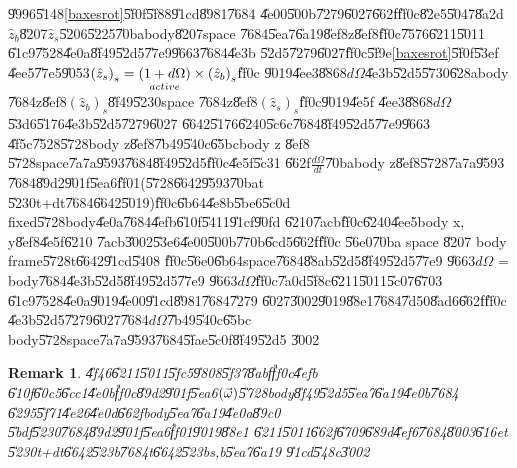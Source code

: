 \documentclass[12pt]{article}
\newtheorem{remark}[theorem]{Remark}
\begin{document}
\U{9996}\U{5148}\ref{baxesrot}\U{5f0f}\U{5f88}\U{91cd}\U{8981}\U{7684}%
\U{4e00}\U{500b}\U{7279}\U{6027}\U{662f}\U{ff0c}\U{82e5}\U{5047}\U{8a2d}$%
\hat{z}_{b}$\U{8207}$\hat{z}_{s}$\U{5206}\U{5225}\U{70ba}body\U{8207}space%
\U{7684}\U{5ea7}\U{6a19}\U{8ef8}z\U{8ef8}\U{ff0c}\U{7576}\U{6211}\U{5011}%
\U{61c9}\U{7528}\U{4e0a}\U{8f49}\U{52d5}\U{77e9}\U{9663}\U{7684}\U{4e3b}%
\U{52d5}\U{7279}\U{6027}\U{ff0c}\U{5f9e}\ref{baxesrot}\U{5f0f}\U{53ef}%
\U{4ee5}\U{77e5}\U{9053}$\left( \hat{z}_{s}\right) _{s}=\underset{active}{%
\left( 1+d\Omega \right) }\times \left( \hat{z}_{b}\right) _{s}$\U{ff0c}%
\U{9019}\U{4ee3}\U{8868}$d\Omega $\U{4e3b}\U{52d5}\U{5730}\U{628a}body%
\U{7684}z\U{8ef8}$\left( \hat{z}_{b}\right) _{s}$\U{8f49}\U{5230}space%
\U{7684}z\U{8ef8}$\left( \hat{z}_{s}\right) _{s}$\U{ff0c}\U{9019}\U{4e5f}%
\U{4ee3}\U{8868}$d\Omega $\U{53d6}\U{5176}\U{4e3b}\U{52d5}\U{7279}\U{6027}%
\U{6642}\U{5176}\U{6240}\U{5c6c}\U{7684}\U{8f49}\U{52d5}\U{77e9}\U{9663}%
\U{4f5c}\U{7528}\U{5728}body z\U{8ef8}\U{7b49}\U{540c}\U{65bc}body z \U{8ef8}%
\U{5728}space\U{7a7a}\U{9593}\U{7684}\U{8f49}\U{52d5}\U{ff0c}\U{4e5f}\U{5c31}%
\U{662f}$\frac{d\Omega }{dt}$\U{70ba}body z\U{8ef8}\U{5728}\U{7a7a}\U{9593}%
\U{7684}\U{89d2}\U{901f}\U{5ea6}\U{ff01}(\U{5728}\U{6642}\U{9593}\U{70ba}t%
\U{5230}t+dt\U{7684}\U{6642}\U{5019})\U{ff0c}\U{6b64}\U{4e8b}\U{5be6}\U{5c0d}%
fixed\U{5728}body\U{4e0a}\U{7684}\U{4efb}\U{610f}\U{5411}\U{91cf}\U{90fd}%
\U{6210}\U{7acb}\U{ff0c}\U{6240}\U{4ee5}body x, y\U{8ef8}\U{4e5f}\U{6210}%
\U{7acb}\U{3002}\U{53e6}\U{4e00}\U{500b}\U{770b}\U{6cd5}\U{662f}\U{ff0c}%
\U{56e0}\U{70ba} space \U{8207} body frame\U{5728}t\U{6642}\U{91cd}\U{5408}%
\U{ff0c}\U{56e0}\U{6b64}space\U{7684}\U{88ab}\U{52d5}\U{8f49}\U{52d5}\U{77e9}%
\U{9663}$d\Omega $ = body\U{7684}\U{4e3b}\U{52d5}\U{8f49}\U{52d5}\U{77e9}%
\U{9663}$d\Omega $\U{ff0c}\U{7a0d}\U{5f8c}\U{6211}\U{5011}\U{5c07}\U{6703}%
\U{61c9}\U{7528}\U{4e0a}\U{9019}\U{4e00}\U{91cd}\U{8981}\U{7684}\U{7279}%
\U{6027}\U{3002}\U{9019}\U{88e1}\U{7684}\U{7d50}\U{8ad6}\U{662f}\U{ff0c}%
\U{4e3b}\U{52d5}\U{7279}\U{6027}\U{7684}$d\Omega $\U{7b49}\U{540c}\U{65bc}%
body\U{5728}space\U{7a7a}\U{9593}\U{7684}\U{5fae}\U{5c0f}\U{8f49}\U{52d5}%
\U{3002}

\begin{remark}
\U{4f46}\U{6211}\U{5011}\U{5fc5}\U{9808}\U{5f37}\U{8abf}\U{ff0c}\U{4efb}%
\U{610f}\U{60c5}\U{6cc1}\U{4e0b}\U{ff0c}\U{89d2}\U{901f}\U{5ea6}$\left( \vec{%
\omega}\right) $\U{5728}body\U{8f49}\U{52d5}\U{5ea7}\U{6a19}\U{4e0b}\U{7684}%
\U{6295}\U{5f71}\U{4e26}\U{4e0d}\U{662f}body\U{5ea7}\U{6a19}\U{4e0a}\U{89c0}%
\U{5bdf}\U{5230}\U{7684}\U{89d2}\U{901f}\U{5ea6}\U{ff01}\U{9019}\U{88e1}%
\U{6211}\U{5011}\U{662f}\U{6709}\U{689d}\U{4ef6}\U{7684}\U{8003}\U{616e}t%
\U{5230}t+dt\U{6642}\U{523b}\U{7684}t\U{6642}\U{523b}s,b\U{5ea7}\U{6a19}%
\U{91cd}\U{548c}\U{3002}
\end{remark}
\end{document}
